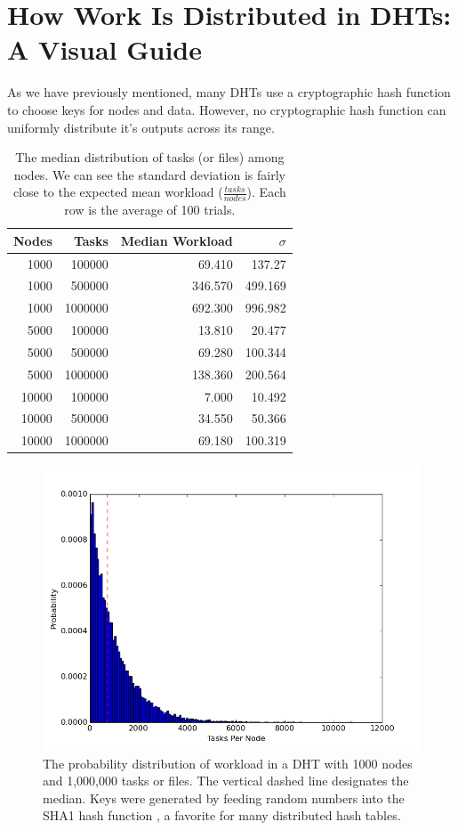 \section{How Work Is Distributed in DHTs: A Visual Guide}

As we have previously mentioned, many DHTs use a cryptographic hash function to choose keys for nodes and data.
However, no cryptographic hash function can uniformly distribute it's outputs across its range. 

\begin{table}
	\centering
	\caption{The median distribution of tasks (or files) among nodes.  We can see the standard deviation is fairly close to the expected mean workload ($\frac{tasks}{nodes}$). Each row is the average of 100 trials.}
	\begin{tabular}{r r r r}
		Nodes & Tasks & Median Workload & $\sigma$ \\ \hline
		1000 & 100000 & 69.410   &  137.27  \\
		1000 & 500000 & 346.570  &  499.169 \\
		1000 &1000000 & 692.300  &  996.982 \\
		
		5000 & 100000  & 13.810 & 20.477 \\ 
		5000 & 500000  & 69.280 & 100.344 \\ 
		5000 & 1000000 &138.360 & 200.564 \\ 
		
		10000 & 100000 & 7.000   &  10.492 \\
		10000 & 500000 & 34.550  &   50.366 \\
		10000 & 1000000& 69.180  &  100.319 \\
	\end{tabular}
	\label{tab:medianLoads}
\end{table}




\begin{figure}
	\centering
	\includegraphics[width=0.7\linewidth]{figs/workloadDistribution}
	\caption[foo]{The probability distribution of workload in a DHT with 1000 nodes and 1,000,000 tasks or files.  The vertical dashed line designates the median.  Keys were generated by feeding random numbers into the SHA1 hash function \cite{sha1}, a favorite for many distributed hash tables.}
	\label{fig:workloadDistribution}
\end{figure}

